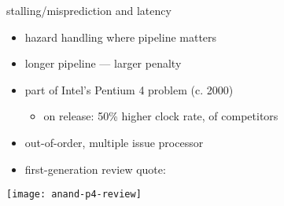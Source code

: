 \begin{frame}{stalling/misprediction and latency}
\begin{itemize}
    \item hazard handling where pipeline  matters
    \item longer pipeline --- larger penalty
    \item part of Intel's Pentium 4 problem (c. 2000)
    \begin{itemize}\item on release: 50\% higher clock rate,  of competitors\end{itemize}
    \item out-of-order, multiple issue processor
    \item first-generation review quote:
\end{itemize}
\texttt{[image: anand-p4-review]}
\end{frame}

